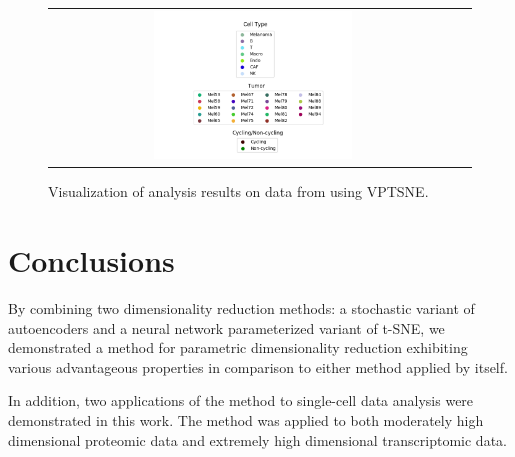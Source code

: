 \begin{figure}[!htb]
\begin{tabular}{cc}
    \includegraphics[width=0.5\textwidth]{images/tirosh_all_legends.png} \\
  \end{tabular}
  \caption{Visualization of analysis results on data from \cite{tirosh} using VPTSNE.}
  \label{fig:tirosh}
\end{figure}

\chapter{Conclusions}
\label{ch:conclusions}

By combining two dimensionality reduction methods: a stochastic variant of autoencoders and a neural network parameterized variant of t-SNE, we demonstrated a method for parametric dimensionality reduction exhibiting various advantageous properties in comparison to either method applied by itself. 

In addition, two applications of the method to single-cell data analysis were demonstrated in this work. The method was applied to both moderately high dimensional proteomic data and extremely high dimensional transcriptomic data. 



\ifnameyear
  
\else
  
\fi


\appendix
